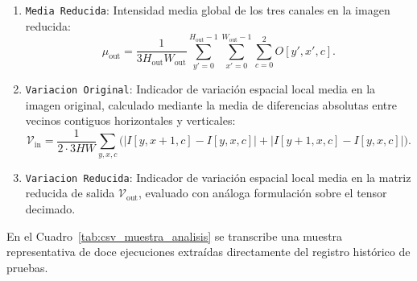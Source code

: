 \documentclass[11pt]{article}
\begin{document}
\begin{enumerate}[itemsep=0.15em]
\begin{equation}
\mu_{\text{in}} = \frac{1}{3 H W} \sum_{y=0}^{H-1} \sum_{x=0}^{W-1} \sum_{c=0}^{2} I[y, x, c].
\end{equation}
\item \texttt{Media Reducida}: Intensidad media global de los tres canales en la imagen reducida:
\begin{equation}
\mu_{\text{out}} = \frac{1}{3 H_{\text{out}} W_{\text{out}}} \sum_{y'=0}^{H_{\text{out}}-1} \sum_{x'=0}^{W_{\text{out}}-1} \sum_{c=0}^{2} O[y', x', c].
\end{equation}
\item \texttt{Variacion Original}: Indicador de variación espacial local media en la imagen original, calculado mediante la media de diferencias absolutas entre vecinos contiguos horizontales y verticales:
\begin{equation}
\mathcal{V}_{\text{in}} = \frac{1}{2 \cdot 3 H W} \sum_{y, x, c} \Big( |I[y, x+1, c] - I[y, x, c]| + |I[y+1, x, c] - I[y, x, c]| \Big).
\end{equation}
\item \texttt{Variacion Reducida}: Indicador de variación espacial local media en la matriz reducida de salida $\mathcal{V}_{\text{out}}$, evaluado con análoga formulación sobre el tensor decimado.
\end{enumerate}

En el Cuadro~\ref{tab:csv_muestra_analisis} se transcribe una muestra representativa de doce ejecuciones extraídas directamente del registro histórico de pruebas.
\end{document}
